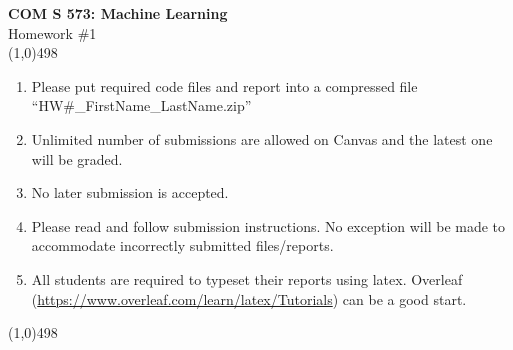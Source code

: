 \documentclass[11pt]{article}
\begin{document}
\begin{center}
{\Large \textbf{COM S 573: Machine Learning}\\Homework \#1}\\

\linethickness{1mm}\line(1,0){498}

\begin{enumerate}
\item Please put required code files and report into a
compressed file ``HW\#\_FirstName\_LastName.zip''
\item Unlimited number of submissions are
allowed on Canvas and the latest one will be graded.
\item {\color{red} No later submission is accepted.}
\item Please read and follow submission instructions. No exception
will be made to accommodate incorrectly submitted files/reports.
\item All students are required to typeset their reports using
latex. Overleaf
(\url{https://www.overleaf.com/learn/latex/Tutorials}) can be a
good start.
\end{enumerate}

\linethickness{1mm}\line(1,0){498}

\end{center}


\end{document}
